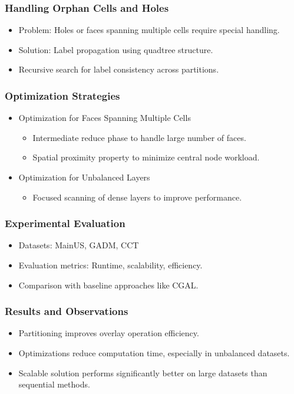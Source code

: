 \documentclass{beamer}
\begin{document}
\begin{frame}
    \frametitle{Handling Orphan Cells and Holes}
    \begin{itemize}
        \item Problem: Holes or faces spanning multiple cells require special handling.
        \item Solution: Label propagation using quadtree structure.
        \item Recursive search for label consistency across partitions.
    \end{itemize}
\end{frame}

\begin{frame}
    \frametitle{Optimization Strategies}
    \begin{itemize}
        \item Optimization for Faces Spanning Multiple Cells
            \begin{itemize}
                \item Intermediate reduce phase to handle large number of faces.
                \item Spatial proximity property to minimize central node workload.
            \end{itemize}
        \item Optimization for Unbalanced Layers
            \begin{itemize}
                \item Focused scanning of dense layers to improve performance.
            \end{itemize}
    \end{itemize}
\end{frame}

\begin{frame}
    \frametitle{Experimental Evaluation}
    \begin{itemize}
        \item Datasets: MainUS, GADM, CCT
        \item Evaluation metrics: Runtime, scalability, efficiency.
        \item Comparison with baseline approaches like CGAL.
    \end{itemize}
\end{frame}

\begin{frame}
    \frametitle{Results and Observations}
    \begin{itemize}
        \item Partitioning improves overlay operation efficiency.
        \item Optimizations reduce computation time, especially in unbalanced datasets.
        \item Scalable solution performs significantly better on large datasets than sequential methods.
    \end{itemize}
\end{frame}
\end{document}
